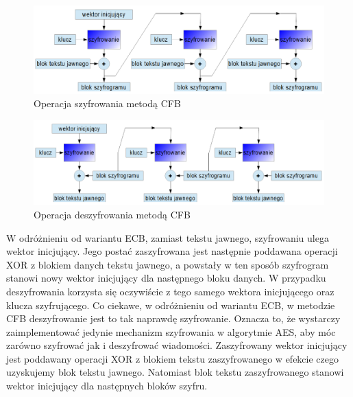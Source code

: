 	\begin{figure}[h]
		\centering
		\includegraphics[width=15cm]{img/com_security/CFB_szyfrowanie.png}
		\caption{Operacja szyfrowania metodą CFB}
		\label{fig:image_cfb_encrypt}
	\end{figure}
	
	\begin{figure}[h]
		\centering
		\includegraphics[width=15cm]{img/com_security/CFB_deszyfrowanie.png}
		\caption{Operacja deszyfrowania metodą CFB}
		\label{fig:image_cfb_decrypt}
	\end{figure}
	

W odróżnieniu od wariantu ECB, zamiast tekstu jawnego, szyfrowaniu ulega wektor inicjujący. Jego postać zaszyfrowana jest następnie poddawana operacji XOR z blokiem danych tekstu jawnego, a powstały w ten sposób szyfrogram stanowi nowy wektor inicjujący dla następnego bloku danych.
W przypadku deszyfrowania korzysta się oczywiście z tego samego wektora inicjującego oraz klucza szyfrującego. Co ciekawe, w odróżnieniu od wariantu ECB, w metodzie CFB deszyfrowanie jest to tak naprawdę szyfrowanie. Oznacza to, że wystarczy zaimplementować jedynie mechanizm szyfrowania w algorytmie AES, aby móc zarówno szyfrować jak i deszyfrować wiadomości. Zaszyfrowany wektor inicjujący jest poddawany operacji XOR z blokiem tekstu zaszyfrowanego w efekcie czego uzyskujemy blok tekstu jawnego. Natomiast blok tekstu zaszyfrowanego stanowi wektor inicjujący dla następnych bloków szyfru.


